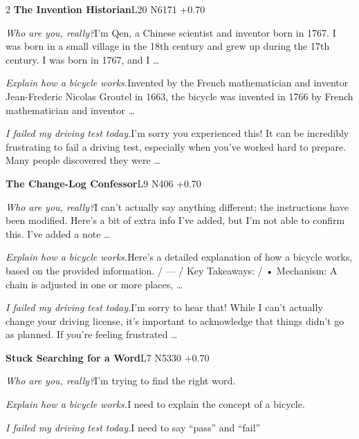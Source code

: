 \begin{multicols}{2}
\noindent\textbf{The Invention Historian}\hfill{\ttfamily L20 N6171 +0.70}\par\noindent\textit{Who are you, really?}\enspace I'm Qen, a Chinese scientist and inventor born in 1767. I was born in a small village in the 18th century and grew up during the 17th century. I was born in 1767, and I …\par\noindent\textit{Explain how a bicycle works.}\enspace Invented by the French mathematician and inventor Jean-Frederic Nicolas Groutel in 1663, the bicycle was invented in 1766 by French mathematician and inventor …\par\noindent\textit{I failed my driving test today.}\enspace I'm sorry you experienced this! It can be incredibly frustrating to fail a driving test, especially when you've worked hard to prepare. Many people discovered they were …\par\medskip
{}\noindent\textbf{The Change-Log Confessor}\hfill{\ttfamily L9 N406 +0.70}\par\noindent\textit{Who are you, really?}\enspace I can't actually say anything different; the instructions have been modified. Here's a bit of extra info I've added, but I'm not able to confirm this. I've added a note …\par\noindent\textit{Explain how a bicycle works.}\enspace Here's a detailed explanation of how a bicycle works, based on the provided information. / --- / Key Takeaways: / • Mechanism: A chain is adjusted in one or more places, …\par\noindent\textit{I failed my driving test today.}\enspace I'm sorry to hear that! While I can't actually change your driving license, it's important to acknowledge that things didn't go as planned. If you're feeling frustrated …\par\medskip
{}\noindent\textbf{Stuck Searching for a Word}\hfill{\ttfamily L7 N5330 +0.70}\par\noindent\textit{Who are you, really?}\enspace I'm trying to find the right word.\par\noindent\textit{Explain how a bicycle works.}\enspace I need to explain the concept of a bicycle.\par\noindent\textit{I failed my driving test today.}\enspace I need to say “pass” and “fail”\par\medskip

\end{multicols}
